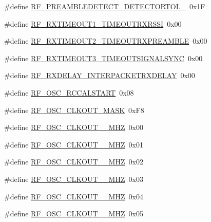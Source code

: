 \begin{DoxyCompactItemize}
\#define \mbox{\hyperlink{sx1276_regs-_fsk_8h_a0c05079f0ba1fe02406808d156d78937}{R\+F\+\_\+\+P\+R\+E\+A\+M\+B\+L\+E\+D\+E\+T\+E\+C\+T\+\_\+\+D\+E\+T\+E\+C\+T\+O\+R\+T\+O\+L\+\_}}~0x1F
\item 
\#define \mbox{\hyperlink{sx1276_regs-_fsk_8h_aac1596be27776611ff5936e308cdb900}{R\+F\+\_\+\+R\+X\+T\+I\+M\+E\+O\+U\+T1\+\_\+\+T\+I\+M\+E\+O\+U\+T\+R\+X\+R\+S\+SI}}~0x00
\item 
\#define \mbox{\hyperlink{sx1276_regs-_fsk_8h_a28172a613ca2fd8925df8b1722bf58ea}{R\+F\+\_\+\+R\+X\+T\+I\+M\+E\+O\+U\+T2\+\_\+\+T\+I\+M\+E\+O\+U\+T\+R\+X\+P\+R\+E\+A\+M\+B\+LE}}~0x00
\item 
\#define \mbox{\hyperlink{sx1276_regs-_fsk_8h_aaee5dfb33a404f5cbdba0a317cb45907}{R\+F\+\_\+\+R\+X\+T\+I\+M\+E\+O\+U\+T3\+\_\+\+T\+I\+M\+E\+O\+U\+T\+S\+I\+G\+N\+A\+L\+S\+Y\+NC}}~0x00
\item 
\#define \mbox{\hyperlink{sx1276_regs-_fsk_8h_a3e60ee872c200009c326412fbc4a84c8}{R\+F\+\_\+\+R\+X\+D\+E\+L\+A\+Y\+\_\+\+I\+N\+T\+E\+R\+P\+A\+C\+K\+E\+T\+R\+X\+D\+E\+L\+AY}}~0x00
\item 
\#define \mbox{\hyperlink{sx1276_regs-_fsk_8h_aa7d737cc3597f1868d03ae2da0d2ef1e}{R\+F\+\_\+\+O\+S\+C\+\_\+\+R\+C\+C\+A\+L\+S\+T\+A\+RT}}~0x08
\item 
\#define \mbox{\hyperlink{sx1276_regs-_fsk_8h_ac744b47205236aa1bab6db5de6d763cb}{R\+F\+\_\+\+O\+S\+C\+\_\+\+C\+L\+K\+O\+U\+T\+\_\+\+M\+A\+SK}}~0x\+F8
\item 
\#define \mbox{\hyperlink{sx1276_regs-_fsk_8h_a39939037ef778589c2a012a432af4001}{R\+F\+\_\+\+O\+S\+C\+\_\+\+C\+L\+K\+O\+U\+T\+\_\+\_\+\+M\+HZ}}~0x00
\item 
\#define \mbox{\hyperlink{sx1276_regs-_fsk_8h_a35cb9b93f3c11029ba94d749886a74b0}{R\+F\+\_\+\+O\+S\+C\+\_\+\+C\+L\+K\+O\+U\+T\+\_\+\_\+\+M\+HZ}}~0x01
\item 
\#define \mbox{\hyperlink{sx1276_regs-_fsk_8h_af99ef1d509dbd26671e0643217f15d02}{R\+F\+\_\+\+O\+S\+C\+\_\+\+C\+L\+K\+O\+U\+T\+\_\+\_\+\+M\+HZ}}~0x02
\item 
\#define \mbox{\hyperlink{sx1276_regs-_fsk_8h_aa7a24066783679941d44574aff9f7f2b}{R\+F\+\_\+\+O\+S\+C\+\_\+\+C\+L\+K\+O\+U\+T\+\_\+\_\+\+M\+HZ}}~0x03
\item 
\#define \mbox{\hyperlink{sx1276_regs-_fsk_8h_a6971552c1ee1dea0c304a1ce1698b7f7}{R\+F\+\_\+\+O\+S\+C\+\_\+\+C\+L\+K\+O\+U\+T\+\_\+\_\+\+M\+HZ}}~0x04
\item 
\#define \mbox{\hyperlink{sx1276_regs-_fsk_8h_a1ca04775f201904ebc725b7d3e642c7b}{R\+F\+\_\+\+O\+S\+C\+\_\+\+C\+L\+K\+O\+U\+T\+\_\+\_\+\+M\+HZ}}~0x05

\end{DoxyCompactItemize}
